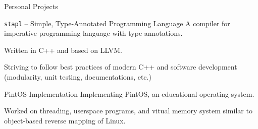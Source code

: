 \documentclass{resume}
\begin{document}
\begin{res-section}{Personal Projects}
  \begin{res-subsection}{\texttt{stapl} -- Simple, Type-Annotated Programming Language}{}
    A compiler for imperative programming language with type annotations.

    \item Written in C++ and based on LLVM.

    \item Striving to follow best practices of modern C++ and software development (modularity, unit testing, documentations, etc.)
  \end{res-subsection}

  \begin{res-subsection}{PintOS Implementation}{}
    Implementing PintOS, an educational operating system.

    \item Worked on threading, userspace programs, and vitual memory system similar to object-based reverse mapping of Linux.
  \end{res-subsection}
\end{res-section}
\end{document}
